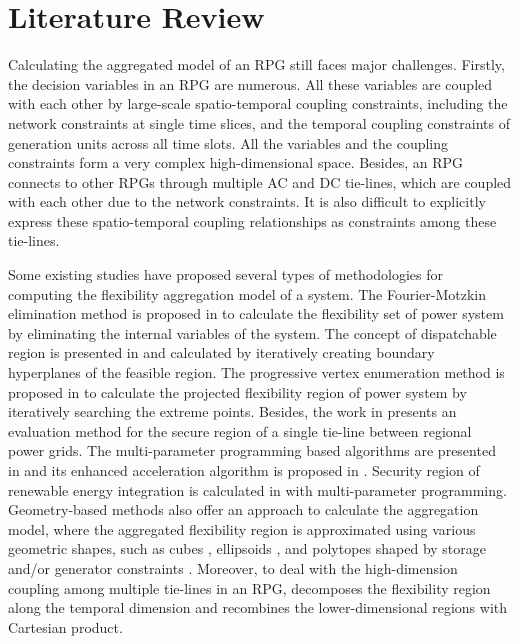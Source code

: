 \section{Literature Review}
Calculating the aggregated model of an RPG still faces major challenges. 
Firstly, the decision variables in an RPG are numerous. 
All these variables are coupled with each other by large-scale spatio-temporal coupling constraints, including the network constraints at single time slices, and the temporal coupling constraints of generation units across all time slots. 
All the variables and the coupling constraints form a very complex high-dimensional space.
Besides, an RPG connects to other RPGs through multiple AC and DC tie-lines, which are coupled with each other due to the network constraints. It is also difficult to explicitly express these spatio-temporal coupling relationships as constraints among these tie-lines.


Some existing studies have proposed several types of methodologies for computing the flexibility aggregation model of a system. 
The Fourier-Motzkin elimination method is proposed in \cite{dantzigFourierMotzkinEliminationIts1973,a.a.jahromiLoadabilitySetsPower2017} to calculate the flexibility set of power system by eliminating the internal variables of the system.
The concept of dispatchable region is presented in \cite{weiDispatchableRegionVariable2015} and calculated by iteratively creating boundary hyperplanes of the feasible region. 
The progressive vertex enumeration method is proposed in \cite{tanEnforcingIntraRegionalConstraints2019} to calculate the projected flexibility region of power system by iteratively searching the extreme points. 
Besides, the work in \cite{linTieLineSecurityRegion2021} presents an evaluation method for the secure region of a single tie-line between regional power grids. 
The multi-parameter programming based algorithms are presented in \cite{linDeterminationTransferCapacity2019} and its enhanced acceleration algorithm is proposed in \cite{linTieLinePowerTransmission2020}. 
Security region of renewable energy integration is calculated in \cite{daiSecurityRegionRenewable2019} with multi-parameter programming.
Geometry-based methods also offer an approach to calculate the aggregation model, where the aggregated flexibility region is approximated using various geometric shapes, such as cubes \cite{chenLeveragingTwoStageAdaptive2021}, ellipsoids \cite{cuiNetworkCognizantTimeCoupledAggregate2021}, and polytopes shaped by storage and/or generator constraints \cite{zhaoAggregatingAdditionalFlexibility2020,wangAggregateFlexibilityVirtual2021,wenAggregateFeasibleRegion2022}.
Moreover, to deal with the high-dimension coupling among multiple tie-lines in an RPG, \cite{linHighdimensionTielineSecurity2023} decomposes the flexibility region along the temporal dimension and recombines the lower-dimensional regions with Cartesian product. 

